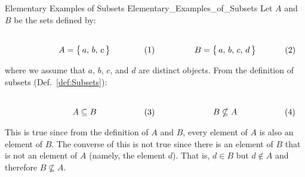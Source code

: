         \begin{fexample}{Elementary Examples of Subsets}
                        {Elementary_Examples_of_Subsets}
            Let $A$ and $B$ be the sets defined by:
            \par
            \begin{subequations}
                \begin{minipage}[b]{0.49\textwidth}
                    \centering
                    \begin{equation}
                        A=\big\{\,a,\,b,\,c\,\big\}
                    \end{equation}
                \end{minipage}
                \hfill
                \begin{minipage}[b]{0.49\textwidth}
                    \centering
                    \begin{equation}
                        B=\big\{\,a,\,b,\,c,\,d\,\big\}
                    \end{equation}
                \end{minipage}
            \end{subequations}
            \par\vspace{2.5ex}
            where we assume that $a$, $b$, $c$, and $d$ are distinct objects.
            From the definition of subsets (Def.~\ref{def:Subsets}):
            \par
            \begin{subequations}
                \begin{minipage}[b]{0.49\textwidth}
                    \centering
                    \begin{equation}
                        A\subseteq{B}
                    \end{equation}
                \end{minipage}
                \hfill
                \begin{minipage}[b]{0.49\textwidth}
                    \centering
                    \begin{equation}
                        B\nsubseteq{A}
                    \end{equation}
                \end{minipage}
            \end{subequations}
            \par\vspace{2.5ex}
            This is true since from the definition of $A$ and $B$, every element
            of $A$ is also an element of $B$. The converse of this is not true
            since there is an element of $B$ that is not an element of $A$
            (namely, the element $d$). That is, $d\in{B}$ but $d\notin{A}$ and
            therefore $B\nsubseteq{A}$.
        \end{fexample}
